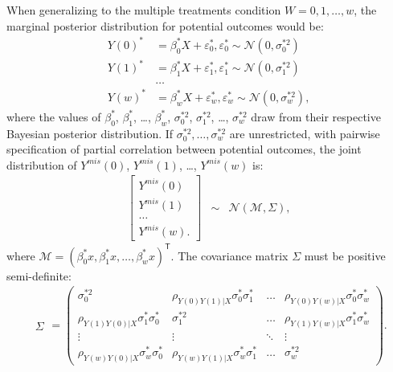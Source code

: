 	When generalizing to the multiple treatments condition $W = 0, 1,\dots,w$, the marginal posterior distribution for potential outcomes would be:
	\begin{align*}
		Y(0)^{*} &= \beta_{0}^{*}X + \varepsilon_{0}^{*}, \varepsilon_{0}^{*} \sim \mathcal{N}(0, \sigma_{0}^{*2})\\
		Y(1)^{*} &= \beta_{1}^{*}X + \varepsilon_{1}^{*}, \varepsilon_{1}^{*} \sim \mathcal{N}(0, \sigma_{1}^{*2})\\
		&\dots\\
		Y(w)^{*} &= \beta_{w}^{*}X + \varepsilon_{w}^{*}, \varepsilon_{w}^{*} \sim \mathcal{N}(0, \sigma_{w}^{*2}),
	\end{align*}
	where the values of $\beta_{0}^{*}$, $\beta_{1}^{*}$, \dots, $\beta_{w}^{*}$, $\sigma_{0}^{*2}$, $\sigma_{1}^{*2}$, \dots, $\sigma_{w}^{*2}$  draw from their respective Bayesian posterior distribution.
	If $\sigma_{0}^{*2}, \dots, \sigma_{w}^{*2}$ are unrestricted, with pairwise specification of partial correlation between potential outcomes, the joint distribution of $Y^{mis}(0)$, $Y^{mis}(1)$, \dots, $Y^{mis}(w)$ is:
	\begin{eqnarray}
		\left[\begin{array}{c}
			Y^{mis}(0)\\
			Y^{mis}(1)\\
			\dots\\
			Y^{mis}(w).
		\end{array}\right] & \sim & \mathcal{N}(\mathcal{M}, \Sigma),
	\end{eqnarray}
	where  $\mathcal{M} = (\beta^{*}_{0}x, \beta^{*}_{1}x, \dots, \beta^{*}_{w}x)^{\mathsf{T}}$. The covariance matrix $\Sigma$ must be positive semi-definite:
	\begin{eqnarray}
		\begin{array}{c}
			\Sigma
		\end{array} = \left(\begin{array}{cccc}
			\sigma^{*2}_{0} & \rho_{Y(0)Y(1)|X}\sigma^{*}_{0}\sigma^{*}_{1} & \dots & \rho_{Y(0)Y(w)|X}\sigma^{*}_{0}\sigma^{*}_{w}\\
			\rho_{Y(1)Y(0)|X}\sigma^{*}_{1}\sigma^{*}_{0} & \sigma^{*2}_{1} & \dots & \rho_{Y(1)Y(w)|X}\sigma^{*}_{1}\sigma^{*}_{w}\\
			\vdots & \vdots & \ddots & \vdots\\
			\rho_{Y(w)Y(0)|X}\sigma^{*}_{w}\sigma^{*}_{0} & \rho_{Y(w)Y(1)|X}\sigma^{*}_{w}\sigma^{*}_{1} & \dots & \sigma^{*2}_{w}
		\end{array}\right).
	\end{eqnarray} 
